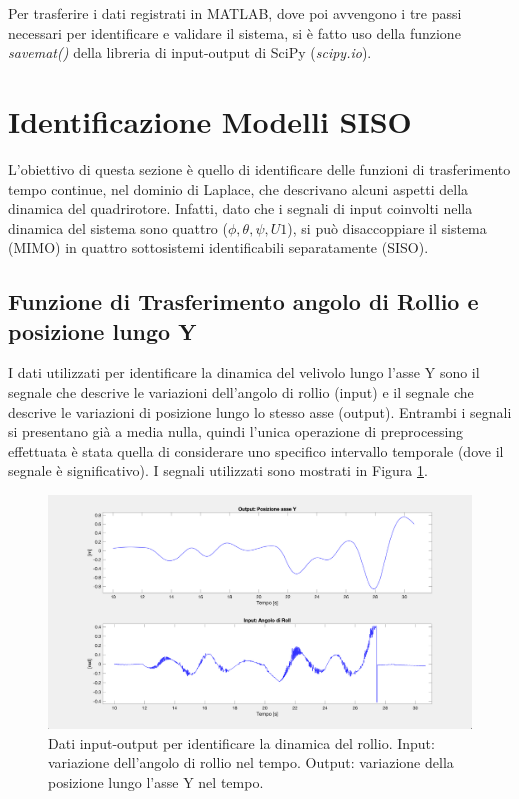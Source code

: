 Per trasferire i dati registrati in MATLAB, dove poi avvengono i tre passi necessari per identificare e validare il sistema, si è fatto uso della funzione \emph{savemat()} della libreria di input-output di SciPy (\emph{scipy.io}).

\section{Identificazione Modelli SISO}
L'obiettivo di questa sezione è quello di identificare delle funzioni di trasferimento tempo continue, nel dominio di Laplace, che descrivano alcuni aspetti della dinamica del quadrirotore. Infatti, dato che i segnali di input coinvolti nella dinamica del sistema sono quattro ($\phi, \theta, \psi, U1$), si può disaccoppiare il sistema (\acs{MIMO}) in quattro sottosistemi identificabili separatamente (\acs{SISO}).\\

\subsection{Funzione di Trasferimento angolo di Rollio e posizione lungo Y}
I dati utilizzati per identificare la dinamica del velivolo lungo l'asse Y sono il segnale che descrive le variazioni dell'angolo di rollio (input) e il segnale che descrive le variazioni di posizione lungo lo stesso asse (output). Entrambi i segnali si presentano già a media nulla, quindi l'unica operazione di preprocessing effettuata è stata quella di considerare uno specifico intervallo temporale (dove il segnale è significativo). I segnali utilizzati sono mostrati in Figura \ref{fig:ry_input}.

\begin{figure}[H]
	\centering
	\includegraphics[width=1\textwidth]{gfx/SysId/ry_input}
	\caption[Dati input-output per identificare la dinamica del rollio.]{Dati input-output per identificare la dinamica del rollio. Input: variazione dell'angolo di rollio nel tempo. Output: variazione della posizione lungo l'asse Y nel tempo.}
	\label{fig:ry_input}
\end{figure}

